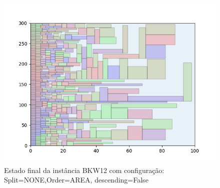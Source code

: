 \begin{figure}[H]
    \centering
    \caption[]{Estado final da instância BKW12 com configuração: Split=NONE,Order=AREA, descending=False}
    \label{fig:bkw12-none-area-false}
    \includegraphics[scale=0.5]{output/figures/bkw/bkw12/none/area/false/000}
\end{figure}